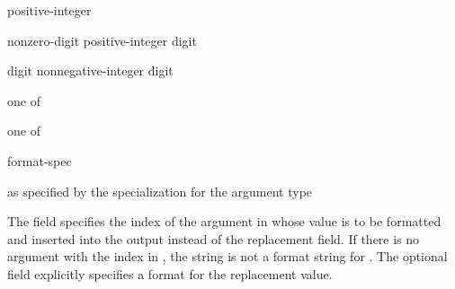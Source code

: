 \begin{ncbnf}
\br
    \br
    positive-integer
\end{ncbnf}

\begin{ncbnf}
\br
    nonzero-digit\br
    positive-integer digit
\end{ncbnf}

\begin{ncbnf}
\br
    digit\br
    nonnegative-integer digit
\end{ncbnf}

\begin{ncbnf}
 \textnormal{one of}\br
\end{ncbnf}

\begin{ncbnf}
 \textnormal{one of}\br
\end{ncbnf}

\begin{ncbnf}
\br
    \terminal{:} format-spec
\end{ncbnf}

\begin{ncbnf}
\br
    \textnormal{as specified by the  specialization for the argument type}
\end{ncbnf}

\pnum
The  field specifies the index of
the argument in 
whose value is to be formatted and inserted into the output
instead of the replacement field.
If there is no argument with
the index  in ,
the string is not a format string for .
The optional  field
explicitly specifies a format for the replacement value.

\pnum
\begin{example}
\begin{codeblock}
string s = format("{0}-{{", 8);         // value of  is 
\end{codeblock}
\end{example}

